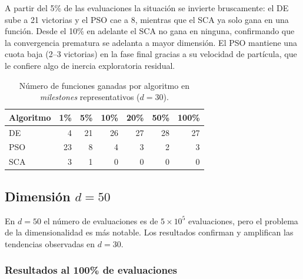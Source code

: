 \documentclass[12pt,a4paper]{article}
\begin{document}
A partir del 5\% de las evaluaciones la situación se invierte bruscamente: el DE sube a 21 victorias y el PSO cae a 8, mientras que el SCA ya solo gana en una función. Desde el 10\% en adelante el SCA no gana en ninguna, confirmando que la convergencia prematura se adelanta a mayor dimensión. El PSO mantiene una cuota baja (2--3 victorias) en la fase final gracias a su velocidad de partícula, que le confiere algo de inercia exploratoria residual.
 
\begin{table}[H]
\centering
\caption{Número de funciones ganadas por algoritmo en \textit{milestones} representativos ($d=30$).}
\label{tab:resumen_victorias_d30}
\renewcommand{\arraystretch}{1.2}
\begin{tabular}{lrrrrrr}
\toprule
\textbf{Algoritmo} & \textbf{1\%} & \textbf{5\%} & \textbf{10\%} & \textbf{20\%} & \textbf{50\%} & \textbf{100\%} \\
\midrule
DE  &  4 & 21 & 26 & 27 & 28 & 27 \\
PSO & 23 &  8 &  4 &  3 &  2 &  3 \\
SCA &  3 &  1 &  0 &  0 &  0 &  0 \\
\bottomrule
\end{tabular}
\end{table}
 
\subsection{Dimensión $d = 50$}
 
En $d=50$ el número de evaluaciones es de $5 \times 10^5$ evaluaciones, pero el problema de la dimensionalidad es más notable. Los resultados confirman y amplifican las tendencias observadas en $d=30$.
 
\subsubsection{Resultados al 100\% de evaluaciones}
\end{document}
